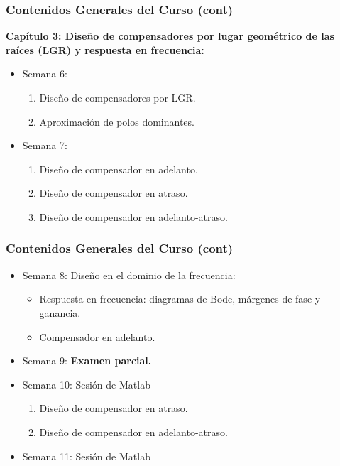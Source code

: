 \documentclass[aspectratio=169,handout]{beamer}
\theoremstyle{definition}
\theoremstyle{plain}
\theoremstyle{remark}
\newcounter{saveenumi}
\newcommand{\seti}{\setcounter{saveenumi}{\value{enumi}}}
\newcommand{\conti}{\setcounter{enumi}{\value{saveenumi}}}
\begin{document}
\begin{frame}[<+->]\frametitle{Contenidos Generales del Curso (cont)}
\textbf{Capítulo 3: Diseño de compensadores por lugar geométrico de las raíces (LGR) y respuesta en frecuencia:}
\begin{itemize}
  \conti
  \item Semana 6:
  \begin{enumerate}
    \item Diseño de compensadores por LGR.
    \item Aproximación de polos dominantes.
  \end{enumerate}
  \item Semana 7:
  \begin{enumerate}
    \item Diseño de compensador en adelanto.
    \item Diseño de compensador en atraso.
    \item Diseño de compensador en adelanto-atraso.
  \end{enumerate}
  \seti
\end{itemize}
\end{frame}

\begin{frame}[<+->]\frametitle{Contenidos Generales del Curso (cont)}
\begin{itemize}
  \conti
  \item Semana 8: Diseño en el dominio de la frecuencia:
  \begin{itemize}
    \item Respuesta en frecuencia: diagramas de Bode, márgenes de fase y ganancia.
    \item Compensador en adelanto.
  \end{itemize}
  \item Semana 9: \textbf{Examen parcial.}
  \item Semana 10: Sesión de Matlab
  \begin{enumerate}
   \item Diseño de compensador en atraso.
   \item Diseño de compensador en adelanto-atraso.
  \end{enumerate}
  \item Semana 11: Sesión de Matlab
  \seti
\end{itemize}
\end{frame}
\end{document}
